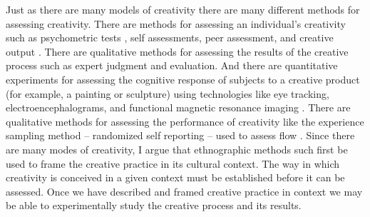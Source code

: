 \documentclass{article}
\begin{document}
Just as there are many models of creativity
there are many different methods for assessing creativity. 
%
There are methods for assessing an individual's creativity 
such as psychometric tests \citep{Drago2014}, 
self assessments, peer assessment, and creative output \citep{Csikszentmihalyi2014}. 
%
There are qualitative methods for assessing the results of the creative process 
such as expert judgment and evaluation. 
And there are quantitative experiments for assessing the cognitive response of subjects to a creative product 
(for example, a painting or sculpture) 
using technologies like eye tracking, electroencephalograms, and functional magnetic resonance imaging
\citep{Chatterjee2014}.
%
There are qualitative methods for assessing the performance of creativity like
the experience sampling method -- randomized self reporting -- used to assess flow \citep{Csikszentmihalyi2014a}.
%
Since there are many modes of creativity, 
I argue that ethnographic methods such first be used to frame the creative practice
in its cultural context. 
The way in which creativity is conceived in a given context must be established before it can be assessed.
%
Once we have described and framed creative practice in context
we may be able to experimentally study the creative process and its results. 









 
\end{document}

